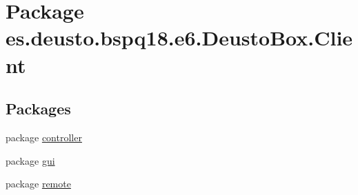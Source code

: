 \hypertarget{namespacees_1_1deusto_1_1bspq18_1_1e6_1_1_deusto_box_1_1_client}{}\section{Package es.\+deusto.\+bspq18.\+e6.\+Deusto\+Box.\+Client}
\label{namespacees_1_1deusto_1_1bspq18_1_1e6_1_1_deusto_box_1_1_client}
\subsection*{Packages}
\begin{DoxyCompactItemize}
\item 
package \mbox{\hyperlink{namespacees_1_1deusto_1_1bspq18_1_1e6_1_1_deusto_box_1_1_client_1_1controller}{controller}}
\item 
package \mbox{\hyperlink{namespacees_1_1deusto_1_1bspq18_1_1e6_1_1_deusto_box_1_1_client_1_1gui}{gui}}
\item 
package \mbox{\hyperlink{namespacees_1_1deusto_1_1bspq18_1_1e6_1_1_deusto_box_1_1_client_1_1remote}{remote}}
\end{DoxyCompactItemize}
